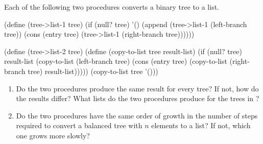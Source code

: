 \begin{exercise}
	\label{Exercise 2.63}
	Each of the following two procedures converts a binary tree to a list.
	\begin{scheme}
	  (define (tree->list-1 tree)
	    (if (null? tree)
	        '()
	        (append (tree->list-1 (left-branch tree))
	                (cons (entry tree)
	                      (tree->list-1
	                        (right-branch tree))))))

	  (define (tree->list-2 tree)
	    (define (copy-to-list tree result-list)
	      (if (null? tree)
	          result-list
	          (copy-to-list (left-branch tree)
	                        (cons (entry tree)
	                              (copy-to-list
	                                (right-branch tree)
	                                result-list)))))
	    (copy-to-list tree '()))
	\end{scheme}
	\begin{enumerate}[label = \alph*., leftmargin = *]

		\item
			Do the two procedures produce the same result for every tree?
			If not, how do the results differ?
			What lists do the two procedures produce for the trees in ?

		\item
			Do the two procedures have the same order of growth in the number of steps required to convert a balanced tree with \( n \) elements to a list?
			If not, which one grows more slowly?

	\end{enumerate}
\end{exercise}



